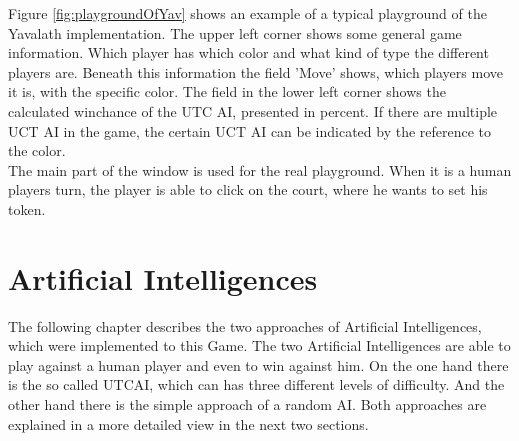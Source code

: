 \documentclass[german]{report}
\begin{document}
\noindent Figure \ref{fig:playgroundOfYav} shows an example of a typical playground of the Yavalath implementation. 
The upper left corner shows some general game information. Which player has which color and what kind of type the different 
players are. Beneath this information the field 'Move' shows, which players move it is, with the specific color. The field in the 
lower left corner shows the calculated winchance of the UTC AI, presented in percent. If there are multiple UCT AI in the game, the 
certain UCT AI can be indicated by the reference to the color.  \\
The main part of the window is used for the real playground. When it is a human players turn, the player is able to click on the court, 
where he wants to set his 
token. 








\chapter{Artificial Intelligences}
\label{sec:artificIntelligences}
The following chapter describes the two approaches of Artificial Intelligences, which were implemented to this Game. The two Artificial Intelligences are able 
to play against a human player and even to win against him. On the one hand there is the so called UTCAI, which can has three different
levels of difficulty. And the other hand there is the simple approach of a random AI. Both approaches are explained in a more detailed view in the next two
sections. 
\end{document}
